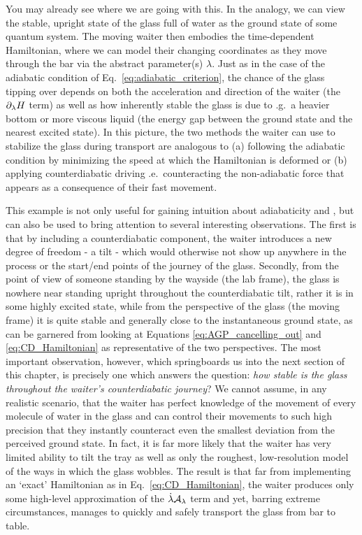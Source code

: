     You may already see where we are going with this. In the analogy, we can view the stable, upright state of the glass full of water as the ground state of some quantum system. The moving waiter then embodies the time-dependent Hamiltonian, where we can model their changing coordinates as they move through the bar via the abstract parameter(s) $\lambda$. Just as in the case of the adiabatic condition of Eq.~\eqref{eq:adiabatic_criterion}, the chance of the glass tipping over depends on both the acceleration and direction of the waiter (the $\partial_{\lambda} H$ term) as well as how inherently stable the glass is due to \@e.g.~a heavier bottom or more viscous liquid (the energy gap between the ground state and the nearest excited state). In this picture, the two methods the waiter can use to stabilize the glass during transport are analogous to (a) following the adiabatic condition by minimizing the speed at which the Hamiltonian is deformed or (b) applying counterdiabatic driving \@i.e.~counteracting the non-adiabatic force that appears as a consequence of their fast movement.
    
    This example is not only useful for gaining intuition about adiabaticity and , but can also be used to bring attention to several interesting observations. The first is that by including a counterdiabatic component, the waiter introduces a new degree of freedom - a tilt - which would otherwise not show up anywhere in the process or the start/end points of the journey of the glass. Secondly, from the point of view of someone standing by the wayside (the lab frame), the glass is nowhere near standing upright throughout the counterdiabatic tilt, rather it is in some highly excited state, while from the perspective of the glass (the moving frame) it is quite stable and generally close to the instantaneous ground state, as can be garnered from looking at Equations \eqref{eq:AGP_cancelling_out} and \eqref{eq:CD_Hamiltonian} as representative of the two perspectives. The most important observation, however, which springboards us into the next section of this chapter, is precisely one which answers the question: \emph{how stable is the glass throughout the waiter's counterdiabatic journey}? We cannot assume, in any realistic scenario, that the waiter has perfect knowledge of the movement of every molecule of water in the glass and can control their movements to such high precision that they instantly counteract even the smallest deviation from the perceived ground state. In fact, it is far more likely that the waiter has very limited ability to tilt the tray as well as only the roughest, low-resolution model of the ways in which the glass wobbles. The result is that far from implementing an `exact'  Hamiltonian as in Eq.~\eqref{eq:CD_Hamiltonian}, the waiter produces only some high-level approximation of the $\dot{\lambda} \mathcal{A}_{\lambda}$ term and yet, barring extreme circumstances, manages to quickly and safely transport the glass from bar to table.

